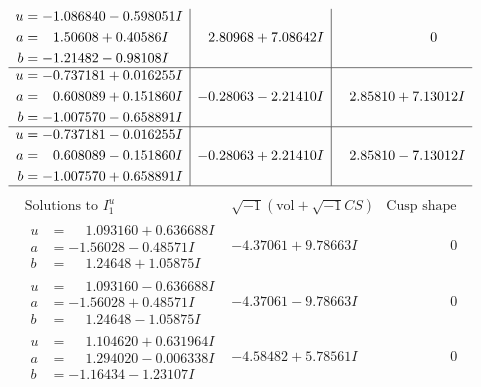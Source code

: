 \documentclass[1p]{elsarticle_modified}
\theoremstyle{definition}
\newcommand{\I}{\sqrt{-1}}
\begin{document}
$$\begin{array}{c|c|c}
\begin{aligned}
u &= -1.086840 - 0.598051 I \\
a &= \phantom{-}1.50608 + 0.40586 I \\
b &= -1.21482 - 0.98108 I\end{aligned}
 & \phantom{-}2.80968 + 7.08642 I & \phantom{-0.000000 } 0 \\ \hline\begin{aligned}
u &= -0.737181 + 0.016255 I \\
a &= \phantom{-}0.608089 + 0.151860 I \\
b &= -1.007570 - 0.658891 I\end{aligned}
 & -0.28063 - 2.21410 I & \phantom{-}2.85810 + 7.13012 I \\ \hline\begin{aligned}
u &= -0.737181 - 0.016255 I \\
a &= \phantom{-}0.608089 - 0.151860 I \\
b &= -1.007570 + 0.658891 I\end{aligned}
 & -0.28063 + 2.21410 I & \phantom{-}2.85810 - 7.13012 I\\
 \hline 
 \end{array}$$\newpage$$\begin{array}{c|c|c}  
\text{Solutions to }I^u_{1}& \I (\text{vol} + \sqrt{-1}CS) & \text{Cusp shape}\\
 \hline 
\begin{aligned}
u &= \phantom{-}1.093160 + 0.636688 I \\
a &= -1.56028 - 0.48571 I \\
b &= \phantom{-}1.24648 + 1.05875 I\end{aligned}
 & -4.37061 + 9.78663 I & \phantom{-0.000000 } 0 \\ \hline\begin{aligned}
u &= \phantom{-}1.093160 - 0.636688 I \\
a &= -1.56028 + 0.48571 I \\
b &= \phantom{-}1.24648 - 1.05875 I\end{aligned}
 & -4.37061 - 9.78663 I & \phantom{-0.000000 } 0 \\ \hline\begin{aligned}
u &= \phantom{-}1.104620 + 0.631964 I \\
a &= \phantom{-}1.294020 - 0.006338 I \\
b &= -1.16434 - 1.23107 I\end{aligned}
 & -4.58482 + 5.78561 I & \phantom{-0.000000 } 0 \\ \hline\begin{aligned}

\end{aligned}
\end{array}$$
\end{document}
